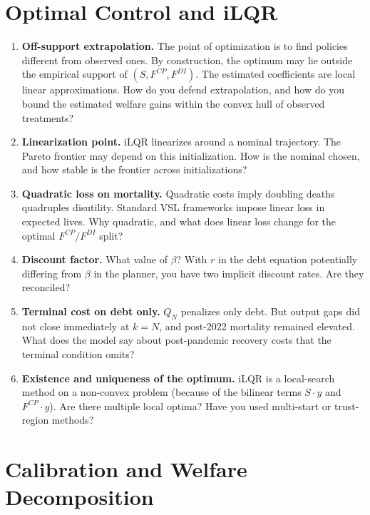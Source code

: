 \documentclass[11pt,a4paper]{article}
\begin{document}
\section{Optimal Control and iLQR}

\begin{enumerate}
\item \textbf{Off-support extrapolation.} The point of optimization is to find policies different from observed ones. By construction, the optimum may lie outside the empirical support of $(S, F^{CP}, F^{DI})$. The estimated coefficients are local linear approximations. How do you defend extrapolation, and how do you bound the estimated welfare gains within the convex hull of observed treatments?

\item \textbf{Linearization point.} iLQR linearizes around a nominal trajectory. The Pareto frontier may depend on this initialization. How is the nominal chosen, and how stable is the frontier across initializations?

\item \textbf{Quadratic loss on mortality.} Quadratic costs imply doubling deaths quadruples disutility. Standard VSL frameworks impose linear loss in expected lives. Why quadratic, and what does linear loss change for the optimal $F^{CP}/F^{DI}$ split?

\item \textbf{Discount factor.} What value of $\beta$? With $r$ in the debt equation potentially differing from $\beta$ in the planner, you have two implicit discount rates. Are they reconciled?

\item \textbf{Terminal cost on debt only.} $Q_N$ penalizes only debt. But output gaps did not close immediately at $k=N$, and post-2022 mortality remained elevated. What does the model say about post-pandemic recovery costs that the terminal condition omits?

\item \textbf{Existence and uniqueness of the optimum.} iLQR is a local-search method on a non-convex problem (because of the bilinear terms $S\cdot y$ and $F^{CP}\cdot y$). Are there multiple local optima? Have you used multi-start or trust-region methods?
\end{enumerate}

\section{Calibration and Welfare Decomposition}
\end{document}
